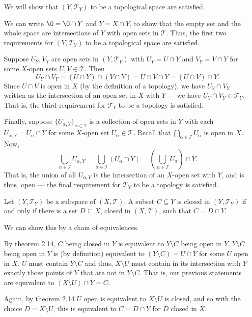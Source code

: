 \documentclass[12 pt, letterpaper]{hmcpset}
\begin{document}
\begin{solution}
	We will show that $(Y, \mathcal{T}_{Y})$ to be a topological space are satisfied.

	We can write $\O = \O \cap Y$ and $Y = X \cap Y$, to show that the empty set and the whole space are intersections of $Y$ with open sets in $\mathcal{T}$. Thus, the first two requirements for $(Y, \mathcal{T}_{Y})$ to be a topological space are satisfied.

	Suppose $U_{Y}, V_{Y}$ are open sets in $(Y, \mathcal{T}_{Y})$ with $U_{Y} = U \cap Y$ and $V_{Y} = V \cap Y$ for some $X$-open sets $U, V \in \mathcal{T}$. Then
	\[
		U_{Y} \cap V_{Y} = (U \cap Y) \cap (V \cap Y) = U \cap V \cap Y = (U \cap V) \cap Y.
	\]
	Since $U \cap V$ is open in $X$ (by the definition of a topology), we have $U_{Y} \cap V_{Y}$ written as the intersection of an open set in $X$ with $Y$ --- we have $U_{Y} \cap V_{Y} \in \mathcal{T}_{Y}$. That is, the third requirement for $\mathcal{T}_{Y}$ to be a topology is satisfied.

	Finally, suppose $\{ U_{\alpha, Y} \}_{\alpha \in \mathcal{I}}$ is a collection of open sets in $Y$ with each $U_{\alpha, Y} = U_{\alpha} \cap Y$ for some $X$-open set $U_{\alpha} \in \mathcal{T}$. Recall that $\bigcap_{\alpha \in \mathcal{I}} U_{\alpha}$ is open in $X$. Now,
	\[
		\bigcup_{\alpha \in \mathcal{I}} U_{\alpha, Y} = \bigcup_{\alpha \in \mathcal{I}} (U_{\alpha} \cap Y) = \left ( \bigcup_{\alpha \in \mathcal{I}} U_{\alpha} \right ) \cap Y.
	\]
	That is, the union of all  $U_{\alpha, Y}$ is the intersection of an $X$-open set with $Y$, and is thus, open --- the final requirement for $\mathcal{T}_{Y}$ to be a topology is satisfied.
\end{solution}

\pagebreak

\begin{problem}[3.28.]
	Let $(Y, \mathcal{T}_{Y})$ be a subspace of $(X, \mathcal{T})$. A subset $C \subseteq Y$ is closed in $(Y, \mathcal{T}_{Y})$ if and only if there is a set $D \subseteq X$, closed in $(X, \mathcal{T})$, such that $C = D \cap Y$.
\end{problem}

\begin{solution}
	We can show this by a chain of equivalences.

	By theorem 2.14, $C$ being closed in $Y$ is equivalent to $Y \setminus C$ being open in $Y$. $Y \setminus C$ being open in $Y$ is (by definition) equivalent to $(Y \setminus C) = U \cap Y$ for some $U$ open in $X$. $U$ must contain $Y \setminus C$ and thus, $X \setminus U$ must contain in its intersection with $Y$ exactly those points of $Y$ that are not in $Y \setminus C$. That is, our previous statements are equivalent to $(X \setminus U) \cap Y = C$.

	Again, by theorem 2.14 $U$ open is equivalent to $X \setminus U$ is closed, and so with the choice $D = X \setminus U$, this is equivalent to $C = D \cap Y$ for $D$ closed in $X$.
\end{solution}
\end{document}
